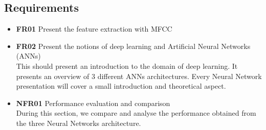 
\subsection{Requirements}

\begin{itemize} 
  \item \textbf{FR01} Present the feature extraction with MFCC \\
  \item \textbf{FR02} Present the notions of deep learning and Artificial Neural
    Networks (ANNs)\\
    This should present an introduction to the domain of deep learning. It
    presents an overview of 3 different ANNs architectures. Every Neural Network
    presentation will cover a small introduction and theoretical aspect.\\
  \item \textbf{NFR01} Performance evaluation and comparison\\ 
    During this section, we compare and analyse the performance obtained from
    the three Neural Networks architecture.
\end{itemize}
